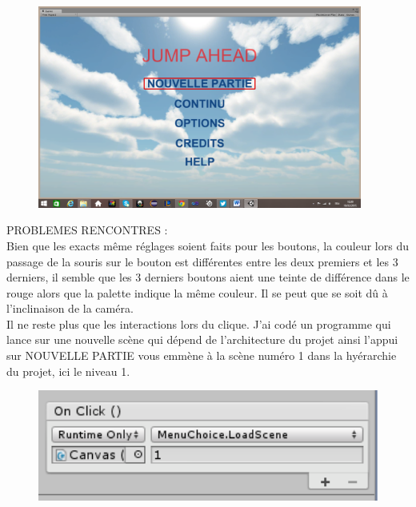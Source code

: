 \documentclass[a4paper]{article}
\begin{document}
\begin{figure}[h]
\begin{center}
\includegraphics[width=0.95\textwidth]{menu1.png}
\end{center}
\end{figure}
PROBLEMES RENCONTRES :\\
Bien que les exacts même réglages soient faits pour les boutons, la couleur lors du passage de la souris sur le bouton est différentes entre les deux premiers et les 3 derniers, il semble que les 3 derniers boutons aient une teinte de différence dans le rouge alors que la palette indique la même couleur. Il se peut que se soit dû à l’inclinaison de la caméra.\\
Il ne reste plus que les interactions lors du clique. J’ai codé un programme qui lance sur une nouvelle scène qui dépend de l’architecture du projet ainsi l’appui sur NOUVELLE PARTIE vous emmène à la scène numéro 1 dans la hyérarchie du projet, ici le niveau 1.\\ 

\begin{figure}[h]
\begin{center}
\includegraphics[width=1\textwidth]{fonctionClick.png}
\end{center}
\end{figure}
\end{document}
